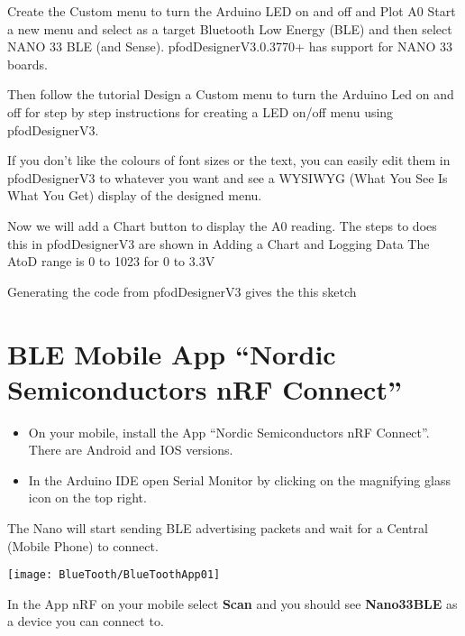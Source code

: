 Create the Custom menu to turn the Arduino LED on and off and Plot A0
Start a new menu and select as a target Bluetooth Low Energy (BLE) and then select NANO 33 BLE (and Sense). pfodDesignerV3.0.3770+ has support for NANO 33 boards.

Then follow the tutorial Design a Custom menu to turn the Arduino Led on and off for step by step instructions for creating a LED on/off menu using pfodDesignerV3.

If you don't like the colours of font sizes or the text, you can easily edit them in pfodDesignerV3 to whatever you want and see a WYSIWYG (What You See Is What You Get) display of the designed menu.

Now we will add a Chart button to display the A0 reading. The steps to does this in pfodDesignerV3 are shown in Adding a Chart and Logging Data The AtoD range is 0 to 1023 for 0 to 3.3V

Generating the code from pfodDesignerV3 gives the this sketch 


\section{BLE Mobile App ``Nordic Semiconductors nRF Connect''}

\begin{itemize}
  \item On your mobile, install the App ``Nordic Semiconductors nRF Connect''. There are Android and IOS versions.
  \item In the Arduino IDE open Serial Monitor by clicking on the magnifying glass icon on the top right.
\end{itemize}

The Nano will start sending BLE advertising packets and wait for a Central (Mobile Phone) to connect.

\begin{center}
  \texttt{[image: BlueTooth/BlueToothApp01]}
\end{center}

\medskip



In the App nRF on your mobile select \textbf{Scan} and you should see \textbf{Nano33BLE} as a device you can connect to.


